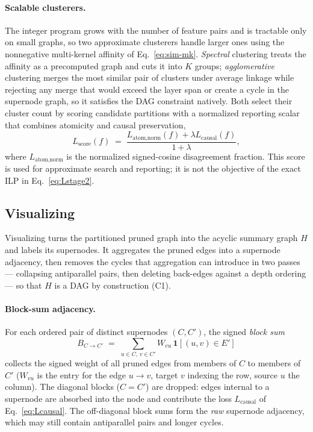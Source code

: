 \documentclass[../main.tex]{subfiles}
\begin{document}
\paragraph{Scalable clusterers.}
The integer program grows with the number of feature pairs and is tractable only on
small graphs, so two approximate clusterers handle larger ones using the nonnegative
multi-kernel affinity of Eq.~\eqref{eq:sim-mk}. \emph{Spectral} clustering treats the
affinity as a precomputed graph and cuts it into $K$ groups; \emph{agglomerative}
clustering merges the most similar pair of clusters under average linkage while
rejecting any merge that would exceed the layer span or create a cycle in the
supernode graph, so it satisfies the DAG constraint natively. Both select their
cluster count by scoring candidate partitions with a normalized reporting scalar
that combines atomicity and causal preservation,
\begin{equation}
L_{\text{score}}(f)
\;=\;
\frac{L_{\text{atom,norm}}(f) + \lambda L_{\text{causal}}(f)}
     {1 + \lambda},
\label{eq:Lscore}
\end{equation}
where $L_{\text{atom,norm}}$ is the normalized signed-cosine disagreement fraction.
This score is used for approximate search and reporting; it is not the objective of
the exact ILP in Eq.~\eqref{eq:Lstage2}.

\subsection{Visualizing}\label{sec:stage3}
Visualizing turns the partitioned pruned graph into the acyclic summary graph $H$ and
labels its supernodes. It aggregates the pruned edges into a supernode adjacency,
then removes the cycles that aggregation can introduce in two passes --- collapsing
antiparallel pairs, then deleting back-edges against a depth ordering --- so that
$H$ is a DAG by construction (C1).

\paragraph{Block-sum adjacency.}
For each ordered pair of distinct supernodes $(C, C')$, the signed \emph{block sum}
\begin{equation}
B_{C \to C'} \;=\; \sum_{u \in C,\, v \in C'} W_{vu}\,\mathbf{1}[(u, v) \in E']
\label{eq:block-sum}
\end{equation}
collects the signed weight of all pruned edges from members of $C$ to members of
$C'$ ($W_{vu}$ is the entry for the edge $u \to v$, target $v$ indexing the row,
source $u$ the column). The diagonal blocks ($C = C'$) are dropped: edges internal
to a supernode are absorbed into the node and contribute the loss
$L_{\text{causal}}$ of Eq.~\eqref{eq:Lcausal}. The off-diagonal block sums form the
\emph{raw} supernode adjacency, which may still contain antiparallel pairs and
longer cycles.
\end{document}
